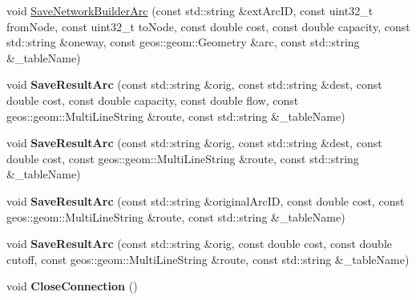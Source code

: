 \begin{DoxyCompactItemize}
\item 
void \hyperlink{classnetxpert_1_1io_1_1FGDBWriter_a10935bb3b8a9b96ca5982020133c6da2}{Save\+Network\+Builder\+Arc} (const std\+::string \&ext\+Arc\+ID, const uint32\+\_\+t from\+Node, const uint32\+\_\+t to\+Node, const double cost, const double capacity, const std\+::string \&oneway, const geos\+::geom\+::\+Geometry \&arc, const std\+::string \&\+\_\+table\+Name)
\item 
void {\bfseries Save\+Result\+Arc} (const std\+::string \&orig, const std\+::string \&dest, const double cost, const double capacity, const double flow, const geos\+::geom\+::\+Multi\+Line\+String \&route, const std\+::string \&\+\_\+table\+Name)\hypertarget{classnetxpert_1_1io_1_1FGDBWriter_a2ce305e5b6be31fbb4915f23589d3f58}{}\label{classnetxpert_1_1io_1_1FGDBWriter_a2ce305e5b6be31fbb4915f23589d3f58}

\item 
void {\bfseries Save\+Result\+Arc} (const std\+::string \&orig, const std\+::string \&dest, const double cost, const geos\+::geom\+::\+Multi\+Line\+String \&route, const std\+::string \&\+\_\+table\+Name)\hypertarget{classnetxpert_1_1io_1_1FGDBWriter_a20881849b5ae7818364f1b62dd41f983}{}\label{classnetxpert_1_1io_1_1FGDBWriter_a20881849b5ae7818364f1b62dd41f983}

\item 
void {\bfseries Save\+Result\+Arc} (const std\+::string \&original\+Arc\+ID, const double cost, const geos\+::geom\+::\+Multi\+Line\+String \&route, const std\+::string \&\+\_\+table\+Name)\hypertarget{classnetxpert_1_1io_1_1FGDBWriter_a0446693ad1ab99dce0471a575bf04a66}{}\label{classnetxpert_1_1io_1_1FGDBWriter_a0446693ad1ab99dce0471a575bf04a66}

\item 
void {\bfseries Save\+Result\+Arc} (const std\+::string \&orig, const double cost, const double cutoff, const geos\+::geom\+::\+Multi\+Line\+String \&route, const std\+::string \&\+\_\+table\+Name)\hypertarget{classnetxpert_1_1io_1_1FGDBWriter_a2ed233090b6e8feb2eff6207dbea7d0a}{}\label{classnetxpert_1_1io_1_1FGDBWriter_a2ed233090b6e8feb2eff6207dbea7d0a}

\item 
void {\bfseries Close\+Connection} ()\hypertarget{classnetxpert_1_1io_1_1FGDBWriter_af86818c4b41f226846754a3746ec009d}{}\label{classnetxpert_1_1io_1_1FGDBWriter_af86818c4b41f226846754a3746ec009d}

\end{DoxyCompactItemize}


